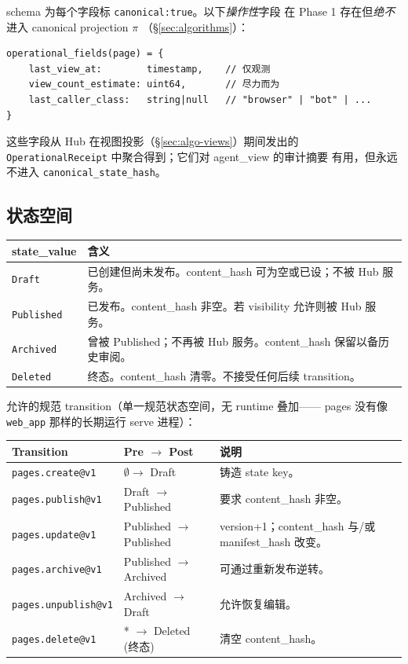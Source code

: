 \documentclass[11pt,a4paper]{article}
\theoremstyle{definition}
\begin{document}
schema 为每个字段标 \texttt{canonical:true}。以下\emph{操作性}字段
在 Phase 1 存在但\emph{绝不}进入 canonical projection $\pi$
（\S\ref{sec:algorithms}）：

\begin{lstlisting}
operational_fields(page) = {
    last_view_at:        timestamp,    // 仅观测
    view_count_estimate: uint64,       // 尽力而为
    last_caller_class:   string|null   // "browser" | "bot" | ...
}
\end{lstlisting}

这些字段从 Hub 在视图投影（\S\ref{sec:algo-views}）期间发出的
\texttt{OperationalReceipt} 中聚合得到；它们对 agent\_view 的审计摘要
有用，但永远不进入 \texttt{canonical\_state\_hash}。

\subsection{状态空间}
\label{sec:state-space}

\begin{center}
\renewcommand{\arraystretch}{1.25}
\begin{tabularx}{\linewidth}{l X}
\toprule
\textbf{state\_value} & \textbf{含义} \\
\midrule
\texttt{Draft}       & 已创建但尚未发布。content\_hash 可为空或已设；不被 Hub 服务。 \\
\texttt{Published}   & 已发布。content\_hash 非空。若 visibility 允许则被 Hub 服务。 \\
\texttt{Archived}    & 曾被 Published；不再被 Hub 服务。content\_hash 保留以备历史审阅。 \\
\texttt{Deleted}     & 终态。content\_hash 清零。不接受任何后续 transition。 \\
\bottomrule
\end{tabularx}
\end{center}

\noindent 允许的规范 transition（单一规范状态空间，无 runtime 叠加——
pages 没有像 \texttt{web\_app} 那样的长期运行 serve 进程）：

\begin{center}
\renewcommand{\arraystretch}{1.2}
\begin{tabularx}{\linewidth}{l l X}
\toprule
\textbf{Transition} & \textbf{Pre $\to$ Post} & \textbf{说明} \\
\midrule
\texttt{pages.create@v1}   & $\emptyset \to$ Draft     & 铸造 state key。 \\
\texttt{pages.publish@v1}  & Draft $\to$ Published     & 要求 content\_hash 非空。 \\
\texttt{pages.update@v1}   & Published $\to$ Published & version+1；content\_hash 与/或 manifest\_hash 改变。 \\
\texttt{pages.archive@v1}  & Published $\to$ Archived  & 可通过重新发布逆转。 \\
\texttt{pages.unpublish@v1}& Archived $\to$ Draft      & 允许恢复编辑。 \\
\texttt{pages.delete@v1}   & * $\to$ Deleted (终态)    & 清空 content\_hash。 \\
\bottomrule
\end{tabularx}
\end{center}
\end{document}
